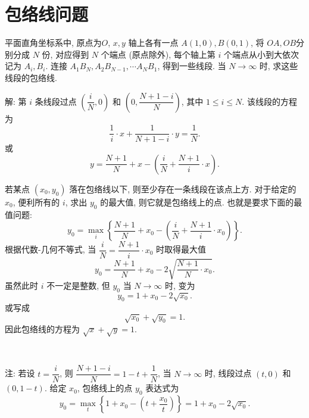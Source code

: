 \section{包络线问题}
平面直角坐标系中, 原点为$O$, $x,y$ 轴上各有一点 $A(1,0), B(0,1)$, 将 $OA,OB$分别分成 $N$ 份, 对应得到 $N$ 个端点 (原点除外), 每个轴上第 $i$ 个端点从小到大依次记为 $A_i, B_i$. 连接 $A_1B_N, A_2B_{N-1}, \cdots A_NB_1$, 得到一些线段. 当 $N\to\infty$ 时, 求这些线段的包络线.
\begin{figure*}[htbp]
\centering
{}
\end{figure*}

解: 第 $i$ 条线段过点 $(\dfrac{i}{N}, 0)$ 和 $(0, \dfrac{N+1-i}{N})$, 其中 $1\le i\le N$. 该线段的方程为
\[\frac{1}{i}\cdot x + \frac{1}{N+1-i}\cdot y=\frac{1}{N}.\]
或
\[y=\frac{N+1}{N} + x - \left(\frac{i}{N} + \frac{N+1}{i}\cdot x\right).\]

若某点 $(x_0,y_0)$ 落在包络线以下, 则至少存在一条线段在该点上方. 对于给定的 $x_0$, 便利所有的 $i$, 求出 $y_0$ 的最大值, 则它就是包络线上的点. 也就是要求下面的最值问题:
\[y_0 = \mathop{\max}_i \left\{ \frac{N+1}{N} + x_0 - \left(\frac{i}{N} + \frac{N+1}{i}\cdot x_0\right) \right\} .\]
根据代数-几何不等式, 当 $\dfrac{i}{N} = \dfrac{N+1}{i}\cdot x_0$ 时取得最大值
\[ y_0 = \frac{N+1}{N} + x_0 - 2\sqrt{\frac{N+1}{N}\cdot x_0} .\]
虽然此时 $i$ 不一定是整数, 但 $y_0$ 
当 $N\to\infty$ 时, 变为
\[y_0 = 1 + x_0 - 2\sqrt{x_0} .\]
或写成
\[\sqrt{x_0}+\sqrt{y_0} = 1.\]
因此包络线的方程为 $\sqrt{x}+\sqrt{y}=1$.

~

注: 若设 $t = \dfrac{i}{N}$, 则 $\dfrac{N+1-i}{N} = 1 - t + \dfrac{1}{N}$, 当 $N\to\infty$ 时, 线段过点 $(t,0)$ 和 $(0,1-t)$. 给定 $x_0$, 包络线上的点 $y_0$ 表达式为
\[ y_0 = \mathop{\max}_t\left\{ 1+x_0 - (t+\frac{x_0}{t}) \right\} = 1 + x_0 - 2\sqrt{x_0} .\]


